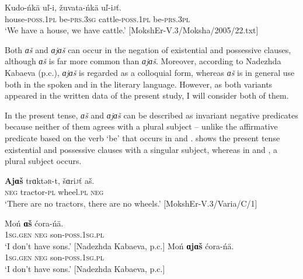 \documentclass[output=paper,colorlinks,citecolor=brown,draft,draftmode]{langscibook}
\begin{document}
\ea\label{ex:moksha-cattle}
\gll Kudo-ńkä uľ-i, žuvata-ńkä uľ-i\textsc{j}ť.\\
house-\textsc{poss.1pl} be-\textsc{prs.3sg} cattle-\textsc{poss.1pl} be-\textsc{prs.3pl}\\
\glt `We have a house, we have cattle.' [MokshEr-V.3/Moksha/2005/22.txt]
\z

  Both \textit{ɑš} and \textit{ɑjɑš} can occur in the negation of existential and possessive clauses, although \textit{ɑš} is far more common than \textit{ɑjɑš}. Moreover, according to Nadezhda Kabaeva (p.c.), \textit{ɑjɑš} is regarded as a colloquial form, whereas \textit{ɑš} is in general use both in the spoken and in the literary language. However, as both variants appeared in the written data of the present study, I will consider both of them.

  In the present tense, \textit{ɑš} and \textit{ɑjɑš} can be described as invariant negative predicates because neither of them agrees with a plural subject -- unlike the affirmative predicate based on the verb `be' that occurs in  and .  shows the present tense existential and possessive clauses with a singular subject, whereas in  and , a plural subject occurs.

\ea\label{ex:moksha-wheel}
\gll \textbf{Ajɑš} trɑktə\textsc{r}-t, šɑri\textsc{j}ť aš.\\
\textsc{neg} tractor-\textsc{pl} wheel.\textsc{pl} \textsc{neg}\\
\glt `There are no tractors, there are no wheels.' [MokshEr-V.3/Varia/C/1]
\z

\ea\label{ex:moksha-no-sons}
\ea\label{ex:moksha-no-sons-1}
\gll Moń \textbf{ɑš} ćora-ńä.\\
\textsc{1sg.gen}    \textsc{neg}    son-\textsc{poss.1sg.pl}\\
\glt `I don't have sons.' [Nadezhda Kabaeva, p.c.]
\ex\label{ex:moksha-no-sons-2}
\gll Moń \textbf{ɑjɑš} ćora-ńä.\\
\textsc{1sg.gen}    \textsc{neg}    son-\textsc{poss.1sg.pl}\\
\glt `I don't have sons.' [Nadezhda Kabaeva, p.c.]
\z\z
\end{document}
